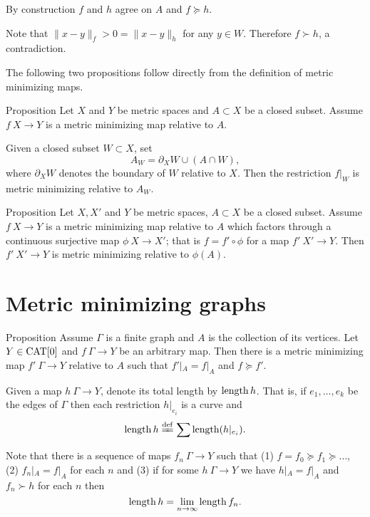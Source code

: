 \documentclass[a4paper,10pt]{amsart}
\begin{document}
By construction $f$ and $h$ agree on $A$ and $f\succcurlyeq h$.

Note that $\|x-y\|_f>0=\|x-y\|_h$ for any $y\in W$.
Therefore $f\succ h$, a contradiction.
\qeds

The following two propositions follow directly from the definition of metric minimizing maps.

\begin{thm}{Proposition}\label{prop:subset}
Let $X$ and $Y$ be metric spaces and $A\subset X$ be a closed subset.
Assume $f\:X\to Y$ is a metric minimizing map relative to $A$.

Given a closed subset $W\subset X$, set 
\[A_W=\partial_X W\cup (A\cap W),\]
where $\partial_X W$ denotes the boundary of $W$ relative to $X$.
Then the restriction $f|_W$ is metric minimizing relative to $A_W$.
\end{thm}

\begin{thm}{Proposition}\label{prop:factor}
Let $X, X'$ and $Y$ be metric spaces, 
$A\subset X$ be a closed subset.
Assume $f\:X\to Y$ is a metric minimizing map relative to $A$
which factors through a continuous surjective map $\phi\:X\to X'$;
that is $f=f'\circ\phi$ for a map $f'\:X'\to Y$.
Then $f'\:X'\to Y$ is metric minimizing relative to $\phi(A)$.
\end{thm}

\section{Metric minimizing graphs}



\begin{thm}{Proposition}
Assume $\Gamma$ is a  finite graph and $A$ is the collection of its vertices.
Let $Y\in\mathop{\rm CAT}\nolimits[0]$ and $f\:\Gamma\to Y$ be an arbitrary map.
Then there is a metric minimizing map $f'\:\Gamma\to Y$ relative to $A$ such that
$f'|_A=f|_A$ and 
$f\succcurlyeq f'$.
\end{thm} 

Given a map $h\:\Gamma\to Y$, denote its total length by $\mathop{\rm length}\nolimits h$.
That is, if $e_1,\dots,e_k$ be the edges of $\Gamma$ 
then each restriction $h|_{e_i}$ is a curve and
\[\length h
\df
\sum\length(h|_{e_i}).\]

Note that there is a sequence of maps $f_n\:\Gamma\to Y$
such that (1)
$f=f_0\succcurlyeq f_1\succcurlyeq\dots$, (2) $f_n|_A=f|_A$ for each $n$ and (3) if for some $h\:\Gamma\to Y$ we have $h|_A=f|_A$ and $f_n\succ h$ for each $n$ then 
\[\mathop{\rm length}\nolimits h=\lim_{n\to\infty}\mathop{\rm length}\nolimits f_n.\]
\end{document}
